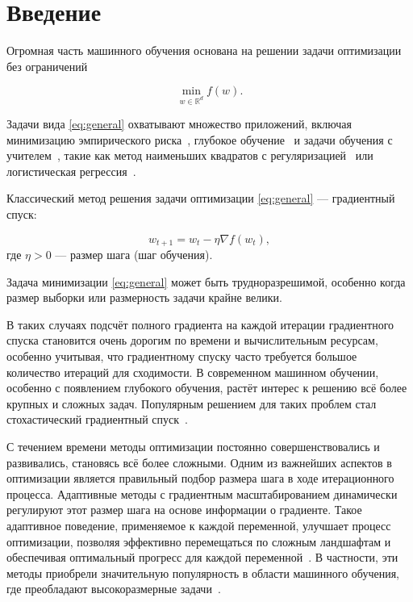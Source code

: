 \section{Введение}

Огромная часть машинного обучения основана на решении задачи оптимизации без ограничений

\begin{equation}
    \label{eq:general}
	\min_{w \in \mathbb{R}^d} f(w).
\end{equation}


Задачи вида \eqref{eq:general} охватывают множество приложений, включая минимизацию эмпирического риска~\citep{chapelle2000vicinal},
глубокое обучение~\citep{lecun2015deep} и задачи обучения с учителем~\citep{cunningham2008supervised}, такие как метод наименьших квадратов с регуляризацией~\citep{rifkin2007notes} или логистическая регрессия~\citep{shalev2014understanding}.

Классический метод решения задачи оптимизации \eqref{eq:general} --- градиентный спуск:

\begin{equation}
    \label{GD}
	w_{t+1} = w_t - \eta \nabla f(w_t),
\end{equation}
где $\eta > 0$ --- размер шага (шаг обучения).

Задача минимизации \eqref{eq:general} может быть трудноразрешимой, особенно когда размер выборки или размерность задачи крайне велики.

В таких случаях подсчёт полного градиента на каждой итерации градиентного спуска становится очень дорогим по времени и вычислительным ресурсам, особенно учитывая, что градиентному спуску часто требуется большое количество итераций для сходимости.
В современном машинном обучении, особенно с появлением глубокого обучения, растёт интерес к решению всё более крупных и сложных задач. Популярным решением для таких проблем стал стохастический градиентный спуск~\citep{robbins1951stochastic, bottou2010large}.


С течением времени методы оптимизации постоянно совершенствовались и развивались, становясь всё более сложными.
Одним из важнейших аспектов в оптимизации является правильный подбор размера шага в ходе итерационного процесса.
Адаптивные методы с градиентным масштабированием динамически регулируют
этот размер шага на основе информации о градиенте. Такое адаптивное поведение, применяемое к каждой переменной, улучшает процесс оптимизации, позволяя эффективно перемещаться по сложным ландшафтам и обеспечивая оптимальный прогресс для каждой переменной~\citep{duchi2011adaptive}. В частности, эти методы приобрели значительную популярность в области машинного обучения, где преобладают высокоразмерные задачи~\citep{zhang2018three, yao2021adahessian}.

